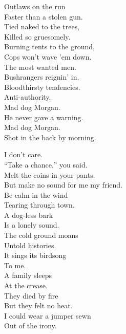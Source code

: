 Outlaws on the run \\
Faster than a stolen gun. \\
Tied naked to the trees, \\
Killed so gruesomely. \\
Burning tents to the ground, \\
Cops won't wave 'em down. \\
The most wanted men. \\
Bushrangers reignin' in. \\

Bloodthirsty tendencies. \\
Anti-authority. \\

Mad dog Morgan. \\
He never gave a warning. \\
Mad dog Morgan. \\
Shot in the back by morning. \\





I don't care. \\
``Take a chance,'' you said. \\
Melt the coins in your pants. \\
But make no sound for me my friend. \\

Be calm in the wind \\
Tearing through town. \\
A dog-less bark \\
Is a lonely sound. \\

The cold ground moans \\
Untold histories. \\
It sings its birdsong \\
To me. \\

A family sleeps \\
At the crease. \\
They died by fire \\
But they felt no heat. \\
I could wear a jumper sewn \\
Out of the irony. \\

